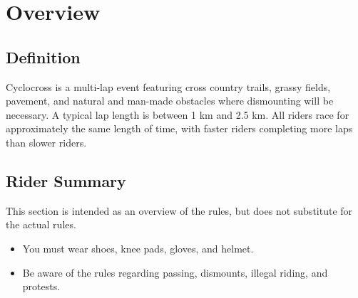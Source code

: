 \chapter{Overview \label{chap:cyclocross}}

\section{Definition}

Cyclocross is a multi-lap event featuring cross country trails, grassy fields, pavement, and natural and man-made obstacles where dismounting will be necessary.
A typical lap length is between 1 km and 2.5 km.
All riders race for approximately the same length of time, with faster riders completing more laps than slower riders.

\section{Rider Summary}

This section is intended as an overview of the rules, but does not
substitute for the actual rules.
\begin{itemize}
\item You must wear shoes, knee pads, gloves, and helmet.
\item Be aware of the rules regarding passing, dismounts, illegal riding, and protests.
\end{itemize}
